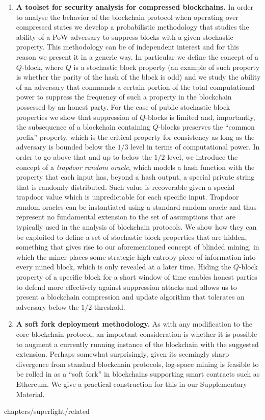 \begin{enumerate}[wide, labelwidth=!, labelindent=0pt, label=(\roman*)]
  \item\textbf{A toolset for security analysis for compressed blockchains.}
In order to analyse the behavior of the blockchain protocol
when operating over compressed states we develop a probabilistic
methodology that studies the ability of a PoW adversary
to suppress blocks with a given stochastic property.
This methodology can be of independent interest and for this reason we present
it in a generic way. In particular we define the concept of a $Q$-block,
where $Q$ is a stochastic block property (an example of such property
is whether the parity of the hash of the block is odd)
and we study the ability of an adversary that commands a certain
portion of the total computational power to suppress the frequency of such a
property in the blockchain possessed by an honest party.
For the case of public stochastic block properties we show that
suppression of $Q$-blocks is limited and, importantly,
the subsequence of a blockchain containing $Q$-blocks preserves
the ``common prefix'' property, which is the critical property
for consistency as long as the adversary is bounded below
the $1/3$ level in terms of computational power.
In order to go above that and up to below the $1/2$ level,
we introduce the concept of a \emph{trapdoor random oracle},
which models a hash function with the property that each input
has, beyond a hash output, a special private string that is
randomly distributed. Such value is recoverable given a special
trapdoor value which is unpredictable for each specific input.
Trapdoor random oracles can be instantiated using a standard
random oracle and thus represent no fundamental extension to the
set of assumptions that are typically used in the analysis
of blockchain protocols. We show how they can be exploited
to define a set of stochastic block properties that are
hidden, something that gives rise to our aforementioned
concept of blinded mining, in which the miner places
some strategic high-entropy piece of information into every mined block, which
is only revealed at a later time.
Hiding
the $Q$-block property of a specific block
for a short window of time
enables honest parties
to defend more effectively against suppression attacks and allows
us to present a blockchain compression and update algorithm that
tolerates an adversary below the $1/2$ threshold.

\item\textbf{A soft fork deployment methodology.}
As with any modification
to the core blockchain protocol, an important consideration is whether
it is possible to augment  a currently running instance of the
blockchain with the suggested extension. Perhaps somewhat surprisingly,
given its seemingly sharp divergence from standard blockchain
protocols, log-space mining is feasible to be rolled in
as a ``soft fork'' in blockchains supporting smart contracts such as Ethereum.
We give a practical construction for this in our
Supplementary Material.
\end{enumerate}

{chapters/superlight/related}

